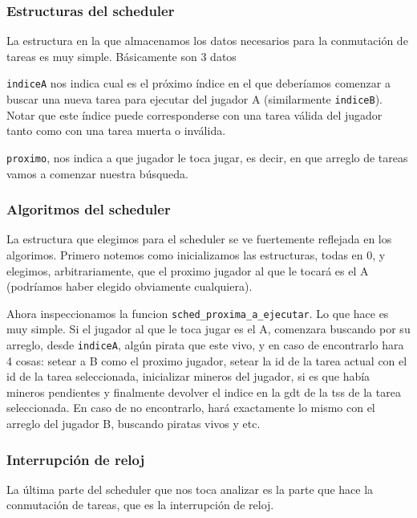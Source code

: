 
 
\subsubsection*{Estructuras del scheduler}
 
La estructura en la que almacenamos los datos necesarios para la conmutación de tareas es muy simple. Básicamente son 3 datos
 
 
\texttt{indiceA} nos indica cual es el próximo índice en el que deberíamos comenzar a buscar una nueva tarea para ejecutar del jugador A (similarmente \texttt{indiceB}). Notar que este índice puede corresponderse con una tarea válida del jugador tanto como con una tarea muerta o inválida.
 
\texttt{proximo}, nos indica a que jugador le toca jugar, es decir, en que arreglo de tareas vamos a comenzar nuestra búsqueda.
 
\subsubsection*{Algoritmos del scheduler}
 
La estructura que elegimos para el scheduler se ve fuertemente reflejada en los algorimos. Primero notemos como inicializamos las estructuras, todas en 0, y elegimos, arbitrariamente, que el proximo jugador al que le tocará es el A (podríamos haber elegido obviamente cualquiera).
 
Ahora inspeccionamos la funcion \texttt{sched_proxima_a_ejecutar}. Lo que hace es muy simple. 
Si el jugador al que le toca jugar es el A, comenzara buscando por su arreglo, desde \texttt{indiceA}, algún pirata que este vivo, y en caso de encontrarlo hara 4 cosas: setear a B como el proximo jugador, setear la id de la tarea actual con el id de la tarea seleccionada, inicializar mineros del jugador, si es que había mineros pendientes y finalmente devolver el indice en la gdt de la tss de la tarea seleccionada.
En caso de no encontrarlo, hará exactamente lo mismo con el arreglo del jugador B, buscando piratas vivos y etc.
 
\subsubsection*{Interrupción de reloj}
 
La última parte del scheduler que nos toca analizar es la parte que hace la conmutación de tareas, que es la interrupción de reloj.
 
